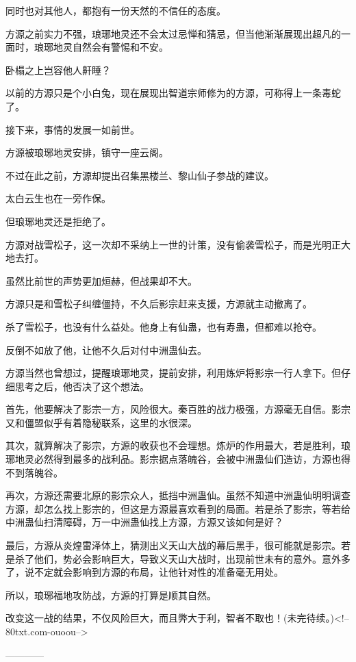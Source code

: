 \begin{this_body}
同时也对其他人，都抱有一份天然的不信任的态度。

方源之前实力不强，琅琊地灵还不会太过忌惮和猜忌，但当他渐渐展现出超凡的一面时，琅琊地灵自然会有警惕和不安。

卧榻之上岂容他人鼾睡？

以前的方源只是个小白兔，现在展现出智道宗师修为的方源，可称得上一条毒蛇了。

接下来，事情的发展一如前世。

方源被琅琊地灵安排，镇守一座云阁。

不过在此之前，方源却提出召集黑楼兰、黎山仙子参战的建议。

太白云生也在一旁作保。

但琅琊地灵还是拒绝了。

方源对战雪松子，这一次却不采纳上一世的计策，没有偷袭雪松子，而是光明正大地去打。

虽然比前世的声势更加烜赫，但战果却不大。

方源只是和雪松子纠缠僵持，不久后影宗赶来支援，方源就主动撤离了。

杀了雪松子，也没有什么益处。他身上有仙蛊，也有寿蛊，但都难以抢夺。

反倒不如放了他，让他不久后对付中洲蛊仙去。

方源当然也曾想过，提醒琅琊地灵，提前安排，利用炼炉将影宗一行人拿下。但仔细思考之后，他否决了这个想法。

首先，他要解决了影宗一方，风险很大。秦百胜的战力极强，方源毫无自信。影宗又和僵盟似乎有着隐秘联系，这里的水很深。

其次，就算解决了影宗，方源的收获也不会理想。炼炉的作用最大，若是胜利，琅琊地灵必然得到最多的战利品。影宗据点落魄谷，会被中洲蛊仙们造访，方源也得不到落魄谷。

再次，方源还需要北原的影宗众人，抵挡中洲蛊仙。虽然不知道中洲蛊仙明明调查方源，却怎么找上影宗的，但这是方源最喜欢看到的局面。若是杀了影宗，等若给中洲蛊仙扫清障碍，万一中洲蛊仙找上方源，方源又该如何是好？

最后，方源从炎煌雷泽体上，猜测出义天山大战的幕后黑手，很可能就是影宗。若是杀了他们，势必会影响巨大，导致义天山大战时，出现前世未有的意外。意外多了，说不定就会影响到方源的布局，让他针对性的准备毫无用处。

所以，琅琊福地攻防战，方源的打算是顺其自然。

改变这一战的结果，不仅风险巨大，而且弊大于利，智者不取也！(未完待续。)<!--80txt.com-ouoou-->

------------

\end{this_body}

